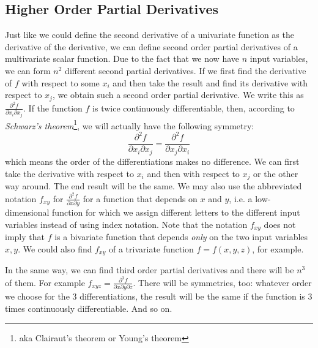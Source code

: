 \subsection{Higher Order Partial Derivatives}
Just like we could define the second derivative of a univariate function as the derivative of the derivative, we can define second order partial derivatives of a multivariate scalar function. Due to the fact that we now have $n$ input variables, we can form $n^2$ different second partial derivatives. If we first find the derivative of $f$ with respect to some $x_i$ and then take the result and find its derivative with respect to $x_j$, we obtain such a second order partial derivative. We write this as $\frac{\partial^2 f}{\partial x_i \partial x_j}$. If the function $f$ is twice continuously differentiable, then, according to \emph{Schwarz's theorem}\footnote{aka Clairaut's theorem or Young's theorem}, we will actually have the following symmetry:
\begin{equation}
	\frac{\partial^2 f}{\partial x_i \partial x_j} 
	=
	\frac{\partial^2 f}{\partial x_j \partial x_i} 
\end{equation}
which means the order of the differentiations makes no difference. We can first take the derivative with respect to $x_i$ and then with respect to $x_j$ or the other way around. The end result will be the same. We may also use the abbreviated notation $f_{xy}$ for $\frac{\partial^2 f}{\partial x \partial y}$ for a function that depends on $x$ and $y$, i.e. a low-dimensional function for which we assign different letters to the different input variables instead of using index notation. Note that the notation $f_{xy}$ does not imply that $f$ is a bivariate function that depends \emph{only} on the two input variables $x,y$. We could also find $f_{xy}$ of a trivariate function $f = f(x,y,z)$, for example.

\medskip
In the same way, we can find third order partial derivatives and there will be $n^3$ of them. For example  $f_{xyz} = \frac{\partial^3 f}{\partial x \partial y \partial z}$. There will be symmetries, too: whatever order we choose for the 3 differentiations, the result will be the same if the function is 3 times continuously differentiable. And so on.


